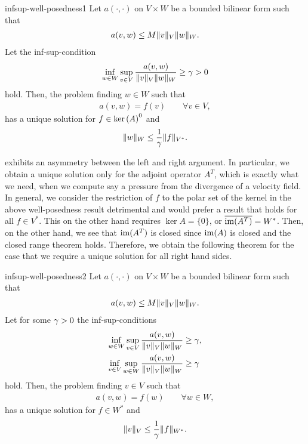 \begin{Corollary}{infsup-well-posedness1}
  Let $a(\cdot,\cdot)$ on $V\times W$ be a bounded bilinear form such that
  \begin{gather}
    a(v,w) \le M \lVert v\rVert_V \lVert w\rVert_W.
  \end{gather}
  Let the inf-sup-condition
  \begin{gather*}
    \inf_{w\in W}\sup_{v\in V}
    \frac{a(v,w)}{\lVert v\rVert_V\lVert w\rVert_W}
    \ge \gamma > 0
  \end{gather*}
  hold.  Then, the problem finding $w\in W$ such that
  \begin{gather*}
    a(v,w) = f(v) \qquad\forall v\in V,
  \end{gather*}
  has a unique solution for $f\in \operatorname{ker}\left(A\right)^0$ and
  \begin{gather}
    \lVert w\rVert_W \le \frac1{\gamma} \lVert f\rVert_{V^*}.
  \end{gather}
\end{Corollary}

\begin{remark}
   exhibits an asymmetry
  between the left and right argument. In particular, we obtain a
  unique solution only for the adjoint operator $A^T$, which is
  exactly what we need, when we compute say a pressure from the
  divergence of a velocity field. In general, we consider the
  restriction of $f$ to the polar set of the kernel in the above
  well-posedness result detrimental and would prefer a result that
  holds for all $f\in V^*$. This on the other hand requires
  $\ker A=\{0\}$, or $\overline{\operatorname{im}(A^T)} = W^*$. Then, on the
  other hand, we see that $\operatorname{im}(A^T)$ is closed since $\operatorname{im}(A)$ is
  closed and the closed range theorem holds. Therefore, we obtain the
  following theorem for the case that we require a unique solution for
  all right hand sides.
\end{remark}

\begin{Theorem}{infsup-well-posedness2}
  Let $a(\cdot,\cdot)$ on $V\times W$ be a bounded bilinear form such that
  \begin{gather}
    a(v,w) \le M \lVert v\rVert_V \lVert w\rVert_W.
  \end{gather}
  Let for some $\gamma>0$ the inf-sup-conditions
  \begin{align*}
    \inf_{w\in W}\sup_{v\in V}
    \frac{a(v,w)}{\lVert v\rVert_V\lVert w\rVert_W}
    &\ge \gamma,\\
    \inf_{v\in V}\sup_{w\in W}
    \frac{a(v,w)}{\lVert v\rVert_V\lVert w\rVert_W}
    &\ge \gamma
  \end{align*}
  hold.  Then, the problem finding $v\in V$ such that
  \begin{gather*}
    a(v,w) = f(w) \qquad\forall w\in W,
  \end{gather*}
  has a unique solution for $f\in W^*$ and
  \begin{gather}
    \lVert v\rVert_V \le \frac1{\gamma} \lVert f\rVert_{W^*}.
  \end{gather}
\end{Theorem}

